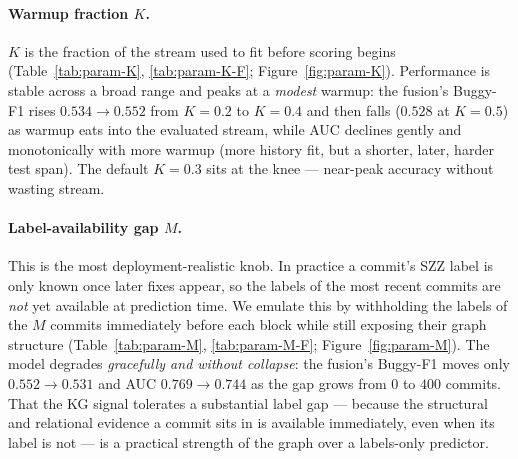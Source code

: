 \documentclass[11pt,a4paper]{article}
\begin{document}
	\paragraph{Warmup fraction $K$.} $K$ is the fraction of the stream used to fit
	before scoring begins (Table~\ref{tab:param-K}, \ref{tab:param-K-F};
	Figure~\ref{fig:param-K}). Performance is stable across a broad range and peaks at
	a \emph{modest} warmup: the fusion's Buggy-F1 rises $0.534\!\to\!0.552$ from
	$K{=}0.2$ to $K{=}0.4$ and then falls ($0.528$ at $K{=}0.5$) as warmup eats into
	the evaluated stream, while AUC declines gently and monotonically with more warmup
	(more history fit, but a shorter, later, harder test span). The default
	$K{=}0.3$ sits at the knee --- near-peak accuracy without wasting stream.

	\paragraph{Label-availability gap $M$.} This is the most deployment-realistic
	knob. In practice a commit's SZZ label is only known once later fixes appear, so
	the labels of the most recent commits are \emph{not} yet available at prediction
	time. We emulate this by withholding the labels of the $M$ commits immediately
	before each block while still exposing their graph structure
	(Table~\ref{tab:param-M}, \ref{tab:param-M-F}; Figure~\ref{fig:param-M}). The model
	degrades \emph{gracefully and without collapse}: the fusion's Buggy-F1 moves only
	$0.552\!\to\!0.531$ and AUC $0.769\!\to\!0.744$ as the gap grows from $0$ to $400$
	commits. That the KG signal tolerates a substantial label gap --- because the
	structural and relational evidence a commit sits in is available immediately, even
	when its label is not --- is a practical strength of the graph over a labels-only
	predictor.
\end{document}
